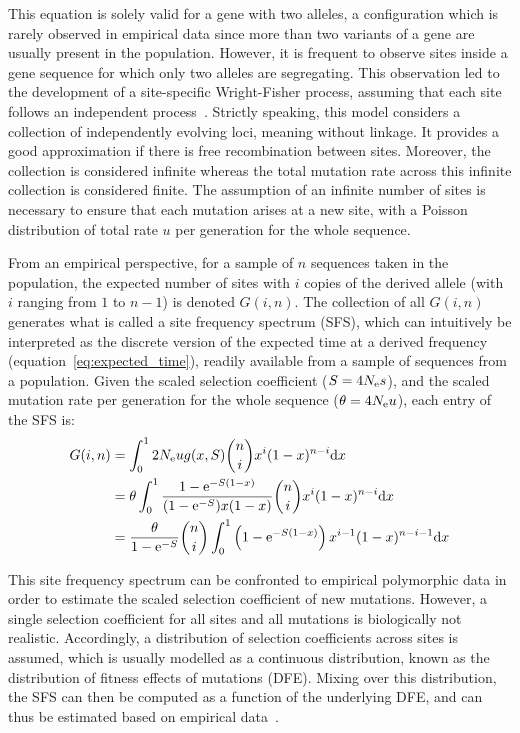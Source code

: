 This equation is solely valid for a gene with two alleles, a configuration which is rarely observed in empirical data since more than two variants of a gene are usually present in the population.
However, it is frequent to observe sites inside a gene sequence for which only two alleles are segregating.
This observation led to the development of a site-specific Wright-Fisher process, assuming that each site follows an independent process~\citep{Sawyer1992}.
Strictly speaking, this model considers a collection of independently evolving loci, meaning without linkage.
It provides a good approximation if there is free recombination between sites.
Moreover, the collection is considered infinite whereas the total mutation rate across this infinite collection is considered finite.
The assumption of an infinite number of sites is necessary to ensure that each mutation arises at a new site, with a Poisson distribution of total rate $u$ per generation for the whole sequence.

From an empirical perspective, for a sample of $n$ sequences taken in the population, the expected number of sites with $i$ copies of the derived allele (with $i$ ranging from $1$ to $n - 1$) is denoted $G(i, n)$.
The collection of all $G(i, n)$ generates what is called a site frequency spectrum (\acrshort{SFS}), which can intuitively be interpreted as the discrete version of the expected time at a derived frequency (equation~\ref{eq:expected_time}), readily available from a sample of sequences from a population.
Given the scaled selection coefficient ($S=4 N_{\textrm{e}} s$), and the scaled mutation rate per generation for the whole sequence ($\theta = 4 N_{\textrm{e}} u $), each entry of the \acrshort{SFS} is:
\begin{align}
    G(i, n) & = \int_{0}^{1}  2 N_{\textrm{e}} u g(x, S) \binom{n}{i} x^{i} (1-x)^{n-i} \mathrm{d} x \\
    & = \theta \int_{0}^{1} \dfrac{1 - \mathrm{e}^{-S(1-x)}}{(1 - \mathrm{e}^{-S})x(1-x)} \binom{n}{i} x^{i} (1-x)^{n-i} \mathrm{d} x \\
    & =  \dfrac{\theta }{1 - \mathrm{e}^{-S}} \binom{n}{i} \int_{0}^{1} \left( 1 - \mathrm{e}^{-S(1-x)} \right) x^{i-1} (1-x)^{n-i-1} \mathrm{d} x
\end{align}

This site frequency spectrum can be confronted to empirical polymorphic data in order to estimate the scaled selection coefficient of new mutations.
However, a single selection coefficient for all sites and all mutations is biologically not realistic.
Accordingly, a distribution of selection coefficients across sites is assumed, which is usually modelled as a continuous distribution, known as the distribution of fitness effects of mutations (\acrshort{DFE}).
Mixing over this distribution, the \acrshort{SFS} can then be computed as a function of the underlying \acrshort{DFE}, and can thus be estimated based on empirical data~\citep{eyre-walker_distribution_2006, eyre-walker_estimating_2009}.


